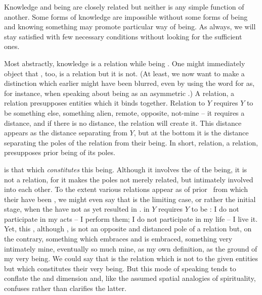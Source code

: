 \pa\label{pa:beKnow}
Knowledge and being are closely related but neither is any simple function
of another. Some forms of knowledge are impossible
without some forms of being and knowing something may promote particular
way of being. As always, we will stay satisfied with few
necessary conditions without looking for the sufficient ones. 

Most abstractly, knowledge is a relation while being . One
might immediately object that , too, is a relation but it is
not. (At least, we now want to make a distinction which earlier might have been
blurred, even by using the word  for  as, for
instance, when speaking about being as an asymmetric .)  A
relation, a  relation  presupposes  entities
which it binds together.  Relation to $Y$ requires $Y$ to be something else,
something alien, remote, opposite, not-mine -- it requires a distance, and if
there is no distance, the relation will create it. This distance appears as the
distance separating  from $Y$, but at the bottom it is the distance
separating the poles of the relation from their being.  In short, relation, a
 relation, presupposes prior being of its poles.

 is that which {\em constitutes} this being. Although
it involves the  of the  being, it is not a
relation, for it makes the poles not merely related, but intimately involved
into each other. To the extent various relations appear as  of prior
\nexuss\ from which their  have been , we might even
say that  is the limiting case, or rather the initial stage, when
the  have not as yet resulted in
.  in $Y$ requires $Y$ to be : I do not participate in my acts -- I perform them; I do not participate in
my life -- I live it. Yet, this , although ,
is not an opposite and distanced pole of a relation but, on the contrary,
something which embraces and is embraced, something very intimately mine,
eventually so much mine, as my own definition, as the ground of my very
being. We could say that  is the relation
which is not  to the given entities but which constitutes their very
being. But this mode of speaking tends to conflate the  and
 dimension and, like the assumed spatial analogies of
spirituality, confuses rather than clarifies the latter. 

